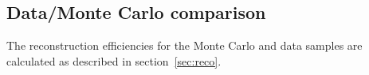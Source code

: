 \documentclass[a4paper,11pt]{article}
\begin{document}




\subsection{Data/Monte Carlo comparison}\label{sec:datamc}
The reconstruction efficiencies for the Monte Carlo and data samples are calculated as described in section~\ref{sec:reco}. %
\end{document}
